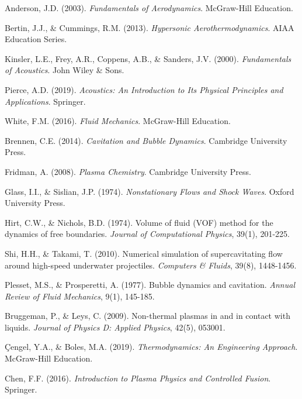 \documentclass[12pt,a4paper]{article}
\begin{document}

\begin{thebibliography}{99}

Anderson, J.D. (2003). \textit{Fundamentals of Aerodynamics}. McGraw-Hill Education.

Bertin, J.J., \& Cummings, R.M. (2013). \textit{Hypersonic Aerothermodynamics}. AIAA Education Series.

Kinsler, L.E., Frey, A.R., Coppens, A.B., \& Sanders, J.V. (2000). \textit{Fundamentals of Acoustics}. John Wiley \& Sons.

Pierce, A.D. (2019). \textit{Acoustics: An Introduction to Its Physical Principles and Applications}. Springer.

White, F.M. (2016). \textit{Fluid Mechanics}. McGraw-Hill Education.

Brennen, C.E. (2014). \textit{Cavitation and Bubble Dynamics}. Cambridge University Press.

Fridman, A. (2008). \textit{Plasma Chemistry}. Cambridge University Press.

Glass, I.I., \& Sislian, J.P. (1974). \textit{Nonstationary Flows and Shock Waves}. Oxford University Press.

Hirt, C.W., \& Nichols, B.D. (1974). Volume of fluid (VOF) method for the dynamics of free boundaries. \textit{Journal of Computational Physics}, 39(1), 201-225.

Shi, H.H., \& Takami, T. (2010). Numerical simulation of supercavitating flow around high-speed underwater projectiles. \textit{Computers \& Fluids}, 39(8), 1448-1456.

Plesset, M.S., \& Prosperetti, A. (1977). Bubble dynamics and cavitation. \textit{Annual Review of Fluid Mechanics}, 9(1), 145-185.

Bruggeman, P., \& Leys, C. (2009). Non-thermal plasmas in and in contact with liquids. \textit{Journal of Physics D: Applied Physics}, 42(5), 053001.

Çengel, Y.A., \& Boles, M.A. (2019). \textit{Thermodynamics: An Engineering Approach}. McGraw-Hill Education.

Chen, F.F. (2016). \textit{Introduction to Plasma Physics and Controlled Fusion}. Springer.


\end{thebibliography}
\end{document}
